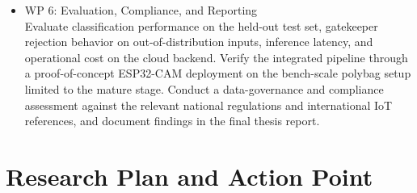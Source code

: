 \begin{itemize}
    \item WP 6: Evaluation, Compliance, and Reporting \\
    Evaluate classification performance on the held-out test set, gatekeeper rejection behavior on out-of-distribution inputs, inference latency, and operational cost on the cloud backend. Verify the integrated pipeline through a proof-of-concept ESP32-CAM deployment on the bench-scale polybag setup limited to the mature stage. Conduct a data-governance and compliance assessment against the relevant national regulations and international IoT references, and document findings in the final thesis report.
\end{itemize}


\section{Research Plan and Action Point}

